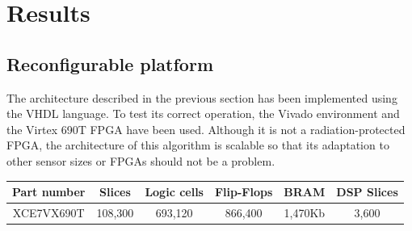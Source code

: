 \cleardoublepage
\chapter{Results}
\label{makereference}
\section{Reconfigurable platform}
The architecture described in the previous section has been implemented using the VHDL language. To test its correct operation, the Vivado environment and the Virtex 690T FPGA have been used. Although it is not a radiation-protected FPGA, the architecture of this algorithm is scalable so that its adaptation to other sensor sizes or FPGAs should not be a problem.

\begin{center}
 \begin{tabular}{|c|c|c|c|c|c|} 
 \hline
 Part number & Slices & Logic cells & Flip-Flops & BRAM & DSP Slices \\
 \hline
 XCE7VX690T & 108,300 & 693,120 & 866,400 & 1,470Kb & 3,600\\
 \hline
\end{tabular}
\end{center}


